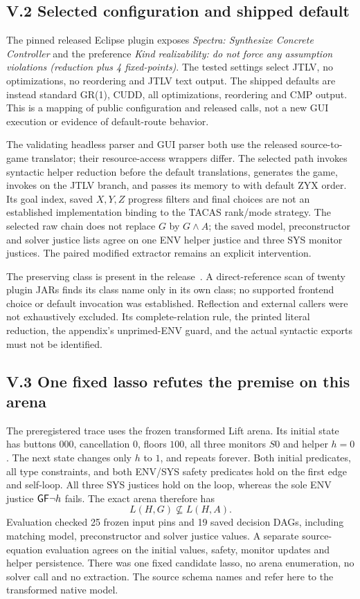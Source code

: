 \subsection*{V.2 Selected configuration and shipped default}
The pinned released Eclipse plugin exposes \emph{Spectra: Synthesize
Concrete Controller} and the preference \emph{Kind realizability: do not
force any assumption violations (reduction plus 4 fixed-points)}.
The tested settings select JTLV, no optimizations, no reordering and
JTLV text output. The shipped defaults are instead standard GR(1), CUDD,
all optimizations, reordering and CMP output. This is a mapping of public
configuration and released calls, not a new GUI execution or evidence
of default-route behavior.

The validating headless parser and GUI parser both use the released
source-to-game translator; their resource-access wrappers differ.
The selected path invokes syntactic helper reduction before the default
translations, generates the game, invokes  on the
JTLV branch, and passes its memory to
 with default ZYX order.
Its goal index, saved $X,Y,Z$ progress filters and final
 choices are not an established implementation
binding to the TACAS rank/mode strategy. The selected raw chain does not
replace $G$ by $G\land A$; the saved model, preconstructor and solver
justice lists agree on one ENV helper justice and three SYS monitor
justices. The paired modified extractor remains an explicit intervention.

The preserving  class is present in the
release~\cite{spectrarelease2024}. A direct-reference scan of twenty
plugin JARs finds its class name only in its own class; no supported
frontend choice or default invocation was established. Reflection and
external callers were not exhaustively excluded. Its complete-relation
rule, the printed literal reduction, the appendix's unprimed-ENV guard,
and the actual syntactic exports must not be identified.

\subsection*{V.3 One fixed lasso refutes the premise on this arena}
The preregistered trace uses the frozen transformed Lift arena. Its
initial state has buttons $000$, cancellation $0$, floors $100$, all
three monitors $S0$ and helper $h=0$. The next state changes only $h$ to
$1$, and repeats forever. Both initial predicates, all type constraints,
and both ENV/SYS safety predicates hold on the first edge and self-loop.
All three SYS justices hold on the loop, whereas the sole ENV justice
$\mathsf{G}\mathsf{F}\neg h$ fails. The exact arena therefore has
\[
 L(H,G)\not\subseteq L(H,A).
\]
Evaluation checked 25 frozen input pins and 19 saved decision DAGs,
including matching model, preconstructor and solver justice values.
A separate source-equation evaluation agrees on the initial values,
safety, monitor updates and helper persistence. There was one fixed
candidate lasso, no arena enumeration, no solver call and no extraction.
The source schema names  and
 refer here to the transformed native model.

